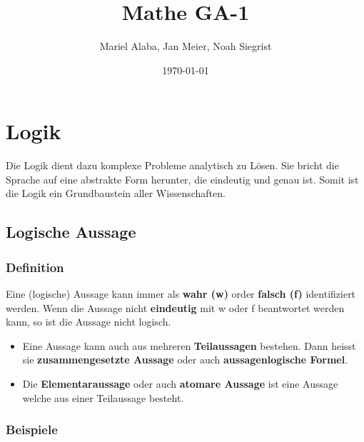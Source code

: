 \documentclass[a4paper,12pt]{article}
\title{\large{\textbf{Mathe GA-1}}}
\author{Mariel Alaba, Jan Meier, Noah Siegrist}
\date{\today}
\begin{document}
\begin{titlingpage}
\maketitle
\end{titlingpage}

\newpage
{}
\tableofcontents

\newpage

\setcounter{page}{1}
\pagestyle{fancy}
\fancyhf{} %
\fancyhead[LE,RO]{\nouppercase{\leftmark}}
\fancyfoot[LE,RO]{\centering{\thepage}}

\newpage

\section{Logik}
\enlargethispage{\baselineskip}
Die Logik dient dazu komplexe Probleme analytisch zu Lösen. Sie bricht die Sprache auf eine abstrakte Form herunter, die eindeutig und genau ist. Somit ist die Logik ein Grundbaustein aller Wissenschaften.

\subsection{Logische Aussage}

\subsubsection{Definition}

Eine (logische) Aussage kann immer als \textbf{wahr (w)} order \textbf{falsch (f)} identifiziert werden. Wenn die Aussage nicht \textbf{eindeutig} mit w oder f beantwortet werden kann, so ist die Aussage nicht logisch.

\begin{itemize}
	\item[] Eine Aussage kann auch aus mehreren \textbf{Teilaussagen} bestehen. Dann heisst sie \textbf{zusammengesetzte Aussage} oder auch \textbf{aussagenlogische Formel}.
	\item[] Die \textbf{Elementaraussage} oder auch \textbf{atomare Aussage} ist eine Aussage welche aus einer Teilaussage besteht.
\end{itemize}

\subsubsection{Beispiele}
\end{document}
